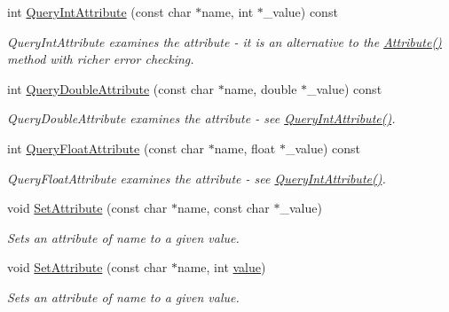 \begin{DoxyCompactItemize}
int \hyperlink{classTiXmlElement_aea0bfe471380f281c5945770ddbf52b9}{QueryIntAttribute} (const char $\ast$name, int $\ast$\_\-value) const 
\begin{DoxyCompactList}\small\item\em QueryIntAttribute examines the attribute -\/ it is an alternative to the \hyperlink{classTiXmlElement_ac1e4691e9375ba4e665dce7e46a50a9c}{Attribute()} method with richer error checking. \item\end{DoxyCompactList}\item 
int \hyperlink{classTiXmlElement_a898d7730ecc341f0bffc7a9dadbf1ce7}{QueryDoubleAttribute} (const char $\ast$name, double $\ast$\_\-value) const 
\begin{DoxyCompactList}\small\item\em QueryDoubleAttribute examines the attribute -\/ see \hyperlink{classTiXmlElement_aea0bfe471380f281c5945770ddbf52b9}{QueryIntAttribute()}. \item\end{DoxyCompactList}\item 
int \hyperlink{classTiXmlElement_aa04d3af11601ef5a5f88295203a843be}{QueryFloatAttribute} (const char $\ast$name, float $\ast$\_\-value) const 
\begin{DoxyCompactList}\small\item\em QueryFloatAttribute examines the attribute -\/ see \hyperlink{classTiXmlElement_aea0bfe471380f281c5945770ddbf52b9}{QueryIntAttribute()}. \item\end{DoxyCompactList}\item 
void \hyperlink{classTiXmlElement_abf0b3bd7f0e4c746a89ec6e7f101fc32}{SetAttribute} (const char $\ast$name, const char $\ast$\_\-value)
\begin{DoxyCompactList}\small\item\em Sets an attribute of name to a given value. \item\end{DoxyCompactList}\item 
void \hyperlink{classTiXmlElement_ace6f4be75e373726d4774073d666d1a7}{SetAttribute} (const char $\ast$name, int \hyperlink{classTiXmlNode_aead528b3cedc33c16a6c539872c7cc8b}{value})
\begin{DoxyCompactList}\small\item\em Sets an attribute of name to a given value. \item\end{DoxyCompactList}\item 

\end{DoxyCompactItemize}
